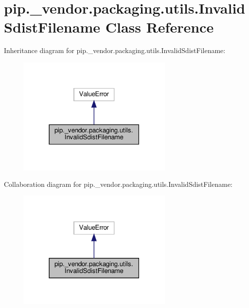 \hypertarget{classpip_1_1__vendor_1_1packaging_1_1utils_1_1InvalidSdistFilename}{}\section{pip.\+\_\+vendor.\+packaging.\+utils.\+Invalid\+Sdist\+Filename Class Reference}
\label{classpip_1_1__vendor_1_1packaging_1_1utils_1_1InvalidSdistFilename}


Inheritance diagram for pip.\+\_\+vendor.\+packaging.\+utils.\+Invalid\+Sdist\+Filename\+:
\nopagebreak
\begin{figure}[H]
\begin{center}
\leavevmode
\includegraphics[width=218pt]{classpip_1_1__vendor_1_1packaging_1_1utils_1_1InvalidSdistFilename__inherit__graph}
\end{center}
\end{figure}


Collaboration diagram for pip.\+\_\+vendor.\+packaging.\+utils.\+Invalid\+Sdist\+Filename\+:
\nopagebreak
\begin{figure}[H]
\begin{center}
\leavevmode
\includegraphics[width=218pt]{classpip_1_1__vendor_1_1packaging_1_1utils_1_1InvalidSdistFilename__coll__graph}
\end{center}
\end{figure}


